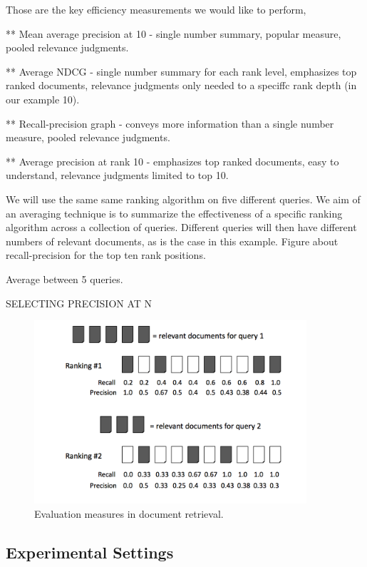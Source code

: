 \documentclass{llncs}
\begin{document}
Those are the key efficiency measurements we would like to perform,

** Mean average precision at 10  - single number summary, popular measure, pooled
relevance judgments.

** Average NDCG - single number summary for each rank level, emphasizes top ranked documents, relevance judgments only needed to a speciffc rank depth
(in our example 10).

** Recall-precision graph - conveys more information than a single number measure, pooled relevance judgments.

** Average precision at rank 10 - emphasizes top ranked documents, easy to understand, relevance judgments limited to top 10.

We will use the same same ranking algorithm on five different queries. We aim of an averaging technique is to summarize the effectiveness of a specific ranking algorithm across a collection of queries. Different queries will then have different numbers of relevant documents, as is the case in this example. Figure about recall-precision for the top ten rank positions.

Average between 5 queries.

SELECTING PRECISION AT N


\begin{figure}[h!]
\centering
\includegraphics[width=0.9\textwidth]{figure/cumulativeGain}
\caption{Evaluation measures in document retrieval.}
\label{fig:namedCumulativeGain}%
\end{figure}

\subsection{Experimental Settings}
\label{sec:experimentalSettings}
\end{document}
